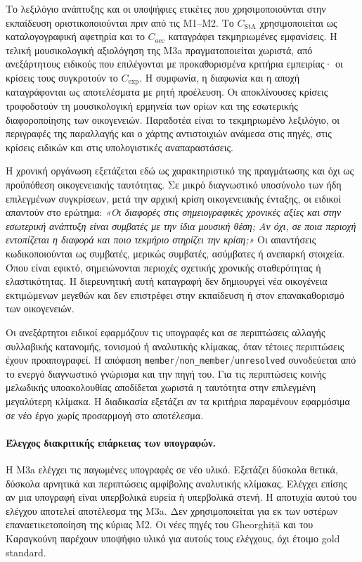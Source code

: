 \documentclass[11pt,a4paper]{article}
\begin{document}
Το λεξιλόγιο ανάπτυξης και οι υποψήφιες ετικέτες που χρησιμοποιούνται στην εκπαίδευση οριστικοποιούνται πριν από τις M1--M2. Το $C_{\mathrm{StA}}$ χρησιμοποιείται ως καταλογογραφική αφετηρία και το $C_{\mathrm{occ}}$ καταγράφει τεκμηριωμένες εμφανίσεις. Η τελική μουσικολογική αξιολόγηση της M3a πραγματοποιείται χωριστά, από ανεξάρτητους ειδικούς που επιλέγονται με προκαθορισμένα κριτήρια εμπειρίας· οι κρίσεις τους συγκροτούν το $C_{\mathrm{exp}}$. Η συμφωνία, η διαφωνία και η αποχή καταγράφονται ως αποτελέσματα με ρητή προέλευση. Οι αποκλίνουσες κρίσεις τροφοδοτούν τη μουσικολογική ερμηνεία των ορίων και της εσωτερικής διαφοροποίησης των οικογενειών. Παραδοτέα είναι το τεκμηριωμένο λεξιλόγιο, οι περιγραφές της παραλλαγής και ο χάρτης αντιστοιχιών ανάμεσα στις πηγές, στις κρίσεις ειδικών και στις υπολογιστικές αναπαραστάσεις.

Η χρονική οργάνωση εξετάζεται εδώ ως χαρακτηριστικό της πραγμάτωσης και όχι ως προϋπόθεση οικογενειακής ταυτότητας. Σε μικρό διαγνωστικό υποσύνολο των ήδη επιλεγμένων συγκρίσεων, μετά την αρχική κρίση οικογενειακής ένταξης, οι ειδικοί απαντούν στο ερώτημα: \emph{«Οι διαφορές στις σημειογραφικές χρονικές αξίες και στην εσωτερική ανάπτυξη είναι συμβατές με την ίδια μουσική θέση; Αν όχι, σε ποια περιοχή εντοπίζεται η διαφορά και ποιο τεκμήριο στηρίζει την κρίση;»} Οι απαντήσεις κωδικοποιούνται ως συμβατές, μερικώς συμβατές, ασύμβατες ή ανεπαρκή στοιχεία. Όπου είναι εφικτό, σημειώνονται περιοχές σχετικής χρονικής σταθερότητας ή ελαστικότητας. Η διερευνητική αυτή καταγραφή δεν δημιουργεί νέα οικογένεια εκτιμώμενων μεγεθών και δεν επιστρέφει στην εκπαίδευση ή στον επανακαθορισμό των οικογενειών.

Οι ανεξάρτητοι ειδικοί εφαρμόζουν τις υπογραφές και σε περιπτώσεις αλλαγής συλλαβικής κατανομής, τονισμού ή αναλυτικής κλίμακας, όταν τέτοιες περιπτώσεις έχουν προαπογραφεί. Η απόφαση \texttt{member}/\texttt{non\_member}/\texttt{unresolved} συνοδεύεται από το ενεργό διαγνωστικό γνώρισμα και την πηγή του. Για τις περιπτώσεις κοινής μελωδικής υποακολουθίας αποδίδεται χωριστά η ταυτότητα στην επιλεγμένη μεγαλύτερη κλίμακα. Η διαδικασία εξετάζει αν τα κριτήρια παραμένουν εφαρμόσιμα σε νέο έργο χωρίς προσαρμογή στο αποτέλεσμα.

\paragraph{Έλεγχος διακριτικής επάρκειας των υπογραφών.}
Η M3a ελέγχει τις παγωμένες υπογραφές σε νέο υλικό. Εξετάζει δύσκολα θετικά, δύσκολα αρνητικά και περιπτώσεις αμφίβολης αναλυτικής κλίμακας. Ελέγχει επίσης αν μια υπογραφή είναι υπερβολικά ευρεία ή υπερβολικά στενή. Η αποτυχία αυτού του ελέγχου αποτελεί αποτέλεσμα της M3a. Δεν χρησιμοποιείται για εκ των υστέρων επαναετικετοποίηση της κύριας M2. Οι νέες πηγές του Gheorghiță και του Καραγκούνη παρέχουν υποψήφιο υλικό για αυτούς τους ελέγχους, όχι έτοιμο gold standard.
\end{document}
